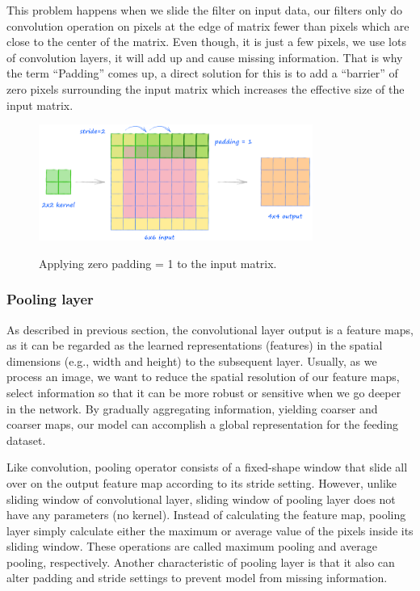 	This problem happens when we slide the filter on input data, our filters only do convolution operation on pixels at the edge of matrix fewer than pixels which are close to the center of the matrix. Even though, it is just a few pixels, we use lots of convolution layers, it will add up and cause missing information. That is why the term “Padding” comes up, a direct solution for this is to add a “barrier” of zero pixels surrounding the input matrix which increases the effective size of the input matrix.
	
	\begin{figure}[H]
		\centering
		{\includegraphics[width=0.8\textwidth]{./hinhanh/chap3/zero_padding.png}}
		\caption{Applying zero padding = 1 to the input matrix.}
	\end{figure}
	
\subsubsection{Pooling layer}
\label{subsubsection:poolinglayer}
\noindent

	As described in previous section, the convolutional layer output is a feature maps, as it can be regarded as the learned representations (features) in the spatial dimensions (e.g., width and height) to the subsequent layer. Usually, as we process an image, we want to reduce the spatial resolution of our feature maps, select information so that it can be more robust or sensitive when we go deeper in the network.  By gradually aggregating information, yielding coarser and coarser maps, our model can accomplish a global representation for the feeding dataset.
	
	Like convolution, pooling operator consists of a fixed-shape window that slide all over on the output feature map according to its stride setting. However, unlike sliding window of convolutional layer, sliding window of pooling layer does not have any parameters (no kernel). Instead of calculating the feature map, pooling layer simply calculate either the maximum or average value of the pixels inside its sliding window. These operations are called maximum pooling and average pooling, respectively. Another characteristic of  pooling layer is that it also can alter padding and stride settings to prevent model from missing information. 	
	
